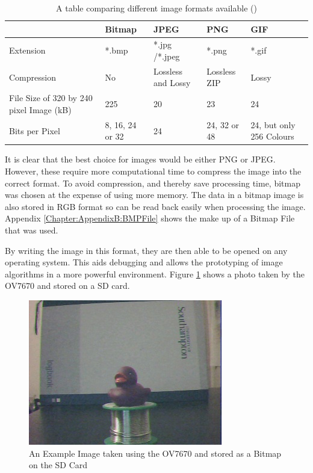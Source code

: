 \begin{table}
\centering
\begin{tabular}{|p{3cm}| p{2cm}|p{2cm}|p{2cm}|p{2cm}|} \hline
			&	Bitmap 		& 	JPEG			 	&	PNG				& 	GIF \\ \hline
Extension 		& 	*.bmp 		&  	*.jpg /*.jpeg 		& 	*.png				& 	*.gif \\ \hline
Compression 	& 	No 			& 	Lossless  and Lossy		&	Lossless ZIP			&	Lossy	\\\hline
File Size of 320 by 
240 pixel Image (kB) &	225			&	20				&	23				&	24 \\\hline
Bits per Pixel		&	8, 16, 24 or 32	&	24				&	24, 32 or 48 			& 	24, but only 256 Colours \\


\hline
\end{tabular}
\caption{A table comparing different image formats available (\cite{ImageComparison})}
\label{ImageFormats}
\end{table}

It is clear that the best choice for images would be either PNG or JPEG. However, these require more computational time to compress the image into the correct format. To avoid compression, and thereby save processing time, bitmap was chosen at the expense of using more memory. The data in a bitmap image is also stored in RGB format so can be read back easily when processing the image. Appendix \ref{Chapter:AppendixB:BMPFile} shows the make up of a Bitmap File that was used.

By writing the image in this format, they are then able to be opened on any operating system. This aids debugging and allows the prototyping of image algorithms in a more powerful environment. Figure \ref{ExampleImage} shows a photo taken by the OV7670 and stored on a SD card.

\begin{figure}
\begin{center}
\includegraphics{Figures/ExampleImageFromCamera.jpg} 
\end{center}
\caption{An Example Image taken using the OV7670 and stored as a Bitmap on the SD Card}
\label{ExampleImage}
\end{figure}

